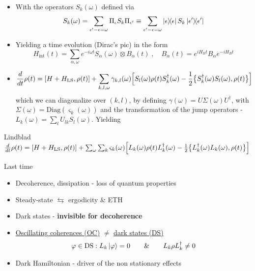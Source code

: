 \documentclass[10pt,xcolor={table,dvipsnames},t]{beamer}
\newcommand{\dt}{\frac{d}{dt}}
\newcommand{\Hint}{H_{\text{int}}}
\newcommand{\outerprod}[2]{\ket{#1}\!\!\bra{#2}}
\begin{document}
\begin{frame}{}
\begin{itemize}
  \item With the operators $S_k(\omega)$ defined via 
    \begin{equation}
      S_k(\omega) = \sum_{\epsilon' - \epsilon = \omega} \Pi_\epsilon S_k \Pi_{\epsilon'} \equiv \sum_{\epsilon' - \epsilon = \omega}\outerprod{\epsilon}{\epsilon} S_k \outerprod{\epsilon'}{\epsilon'}
    \end{equation}
  \item Yielding a time evolution (Dirac's pic) in the form 
    \begin{equation}
      \Hint(t) = \sum_{\alpha, \omega} e^{-i\omega t} S_\alpha (\omega) \otimes B_\alpha (t)\;, \quad B_\alpha(t) = e^{iH_B t}B_\alpha e^{-iH_B t}
    \end{equation}
  \item $$\dt \rho(t) = [H+H_\text{LS}, \rho(t)] + \sum_{k,l, \omega} \gamma_{k,l}(\omega) \Bigl[S_l(\omega)\rho(t)S_k^\dag(\omega) - \frac{1}{2}\bigl\{ S_k^\dag(\omega) S_l(\omega), \rho(t) \bigr\}\Bigr]$$
            which we can diagonalize over $(k,l)$, by defining $\gamma(\omega) = U \varSigma(\omega) U^\dag$, with $\varSigma(\omega) = \text{Diag}(\varsigma_k(\omega))$ and the transformation of 
            the jump operators - $L_k(\omega) = \sum_l U_{lk}S_l(\omega)$. Yielding
\end{itemize}
\begin{block}{Lindblad}
              $\dt \rho(t) = [H+H_\text{LS}, \rho(t)] + \sum_{\omega} \sum_k \varsigma_k(\omega)\Bigl[L_k(\omega)\rho(t)L_k^\dag(\omega) - \frac{1}{2}\bigl\{ L_k^\dag(\omega)L_k(\omega), \rho(t) \bigr\}\Bigr]$
          \end{block}
\end{frame}
\begin{frame}{Last time}
  \begin{itemize}
    \item<1-> Decoherence, dissipation - loss of quantum properties 
    \item<2-> Steady-state $\leftrightarrows$ ergodicity \& ETH
    \item<3-> Dark states - \textbf{invisible for decoherence}
    \item<4-> \underline{Oscillating coherences (OC)} $\neq$ \underline{dark states (DS)}
      $$\varphi \in \text{DS}: L_k \ket{\varphi} = 0 \qquad \& \qquad L_k\rho L_k^\dag \neq 0$$
    \item<5-> Dark Hamiltonian - driver of the non stationary effects
  \end{itemize}
\end{frame}
\end{document}
